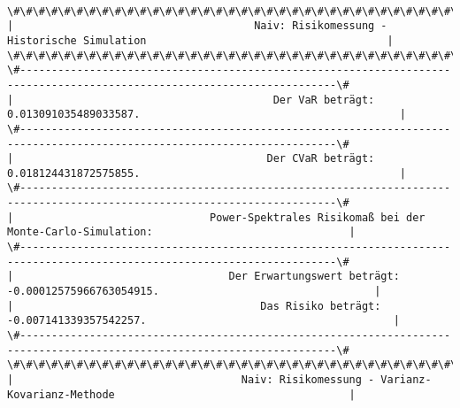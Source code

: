 \documentclass[paper=landscape]{scrartcl}
\begin{document}
    \begin{center}
    \end{center}
    { \hspace*{\fill} \\}
    
    \begin{Verbatim}[commandchars=\\\{\}]
\#\#\#\#\#\#\#\#\#\#\#\#\#\#\#\#\#\#\#\#\#\#\#\#\#\#\#\#\#\#\#\#\#\#\#\#\#\#\#\#\#\#\#\#\#\#\#\#\#\#\#\#\#\#\#\#\#\#\#\#\#\#\#\#\#\#\#\#\#\#\#\#\#\#\#\#\#\#\#\#\#\#\#\#\#\#\#\#\#\#\#\#\#\#\#\#\#\#\#\#\#\#\#\#\#\#\#\#\#\#\#\#\#\#\#\#\#\#\#\#\#\#
|                                      Naiv: Risikomessung - Historische Simulation                                      | 
\#\#\#\#\#\#\#\#\#\#\#\#\#\#\#\#\#\#\#\#\#\#\#\#\#\#\#\#\#\#\#\#\#\#\#\#\#\#\#\#\#\#\#\#\#\#\#\#\#\#\#\#\#\#\#\#\#\#\#\#\#\#\#\#\#\#\#\#\#\#\#\#\#\#\#\#\#\#\#\#\#\#\#\#\#\#\#\#\#\#\#\#\#\#\#\#\#\#\#\#\#\#\#\#\#\#\#\#\#\#\#\#\#\#\#\#\#\#\#\#\#\#
\#------------------------------------------------------------------------------------------------------------------------\#
|                                         Der VaR beträgt: 0.013091035489033587.                                         | 
\#------------------------------------------------------------------------------------------------------------------------\#
|                                        Der CVaR beträgt: 0.018124431872575855.                                         | 
\#------------------------------------------------------------------------------------------------------------------------\#
|                               Power-Spektrales Risikomaß bei der Monte-Carlo-Simulation:                               | 
\#------------------------------------------------------------------------------------------------------------------------\#
|                                  Der Erwartungswert beträgt: -0.00012575966763054915.                                  | 
|                                       Das Risiko beträgt: -0.007141339357542257.                                       | 
\#------------------------------------------------------------------------------------------------------------------------\#
\#\#\#\#\#\#\#\#\#\#\#\#\#\#\#\#\#\#\#\#\#\#\#\#\#\#\#\#\#\#\#\#\#\#\#\#\#\#\#\#\#\#\#\#\#\#\#\#\#\#\#\#\#\#\#\#\#\#\#\#\#\#\#\#\#\#\#\#\#\#\#\#\#\#\#\#\#\#\#\#\#\#\#\#\#\#\#\#\#\#\#\#\#\#\#\#\#\#\#\#\#\#\#\#\#\#\#\#\#\#\#\#\#\#\#\#\#\#\#\#\#\#
|                                    Naiv: Risikomessung - Varianz-Kovarianz-Methode                                     | 

\end{Verbatim}
\end{document}
